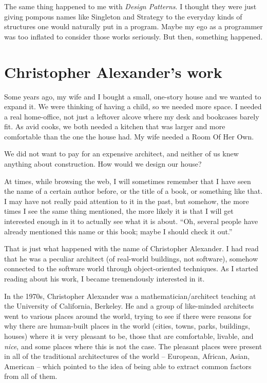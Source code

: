 The same thing happened to me with \textit{Design Patterns}. I thought they were
just giving pompous names like Singleton and Strategy to the everyday kinds of
structures one would naturally put in a program. Maybe my ego as a programmer
was too inflated to consider those works seriously. But then, something
happened.

\section*{Christopher Alexander's work}

Some years ago, my wife and I bought a small, one-story house and we wanted to
expand it. We were thinking of having a child, so we needed more space. I needed
a real home-office, not just a leftover alcove where my desk and bookcases
barely fit. As avid cooks, we both needed a kitchen that was larger and more
comfortable than the one the house had. My wife needed a Room Of Her Own.

We did not want to pay for an expensive architect, and neither of us knew
anything about construction. How would we design our house?

At times, while browsing the web, I will sometimes remember that I have seen the
name of a certain author before, or the title of a book, or something like that.
I may have not really paid attention to it in the past, but somehow, the more
times I see the same thing mentioned, the more likely it is that I will get
interested enough in it to actually see what it is about. ``Oh, several people
have already mentioned this name or this book; maybe I should check it out.''

That is just what happened with the name of Christopher Alexander. I had read
that he was a peculiar architect (of real-world buildings, not software),
somehow connected to the software world through object-oriented techniques. As I
started reading about his work, I became tremendously interested in it.

In the 1970s, Christopher Alexander was a mathematician/architect teaching at
the University of California, Berkeley. He and a group of like-minded architects
went to various places around the world, trying to see if there were reasons for
why there are human-built places in the world (cities, towns, parks, buildings,
houses) where it is very pleasant to be, those that are comfortable, livable,
and \textit{nice}, and some places where this is not the case. The pleasant
places were present in all of the traditional architectures of the world --
European, African, Asian, American -- which pointed to the idea of being able to
extract common factors from all of them.

